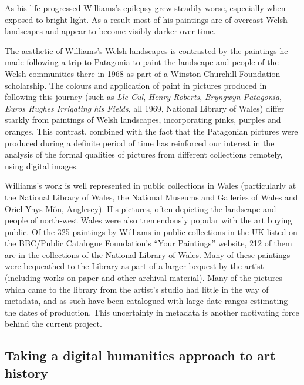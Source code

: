 As his life progressed Williams's epilepsy grew steadily worse, especially when exposed to 
bright light. As a result most of his paintings are of overcast Welsh landscapes and appear to 
become visibly darker over time\cite{Harris2011How}.


The aesthetic of Williams's Welsh landscapes is contrasted by the paintings he
made following a trip to Patagonia to paint the landscape and people of the
Welsh communities there in 1968 as part of a Winston Churchill Foundation
scholarship. The colours and application of paint in pictures produced in
following this journey (such as \emph{Lle Cul}, \emph{Henry Roberts},
\emph{Bryngwyn Patagonia}, \emph{Euros Hughes Irrigating his Fields}, all 1969,
National Library of Wales) differ starkly from paintings of Welsh landscapes,
incorporating pinks, purples and oranges. This contrast, combined with the fact
that the Patagonian pictures were produced during a definite period of time has
reinforced our interest in the analysis of the formal qualities of pictures
from different collections remotely, using digital images. 

Williams's work is well represented in public collections in Wales
(particularly at the National Library of Wales, the National Museums and
Galleries of Wales and Oriel Ynys M\^{o}n, Anglesey). His pictures, often
depicting the landscape and people of north-west Wales were also tremendously
popular with the art buying public. Of the 325 paintings by Williams in public
collections in the UK listed on the BBC/Public Catalogue Foundation's ``Your
Paintings'' website, 212 of them are in the collections of the National Library
of Wales\cite{2013Your}. Many of these paintings were bequeathed to the Library
as part of a larger bequest by the artist (including works on paper and other
archival material). Many of the pictures which came to the library from the
artist’s studio had little in the way of metadata, and as such have been
catalogued with large date-ranges estimating the dates of production.  This
uncertainty in metadata is another motivating force behind the current project.


\subsection{Taking a digital humanities approach to art history}

